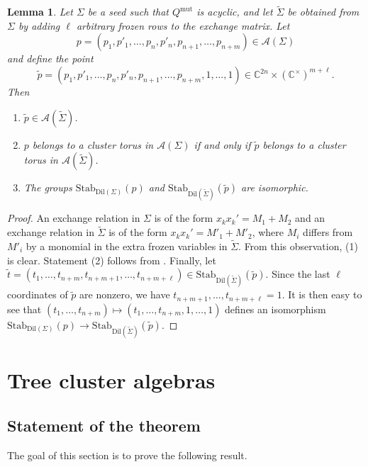 \documentclass{amsart}
\newcommand{\seed}{\Sigma}
\newcommand{\mut}{\mathrm{mut}}
\newcommand{\var}{\mathcal{A}}
\newcommand{\Stab}{\mathrm{Stab}}
\newcommand{\C}{\mathbb{C}}
\numberwithin{equation}{section}
\newtheorem{lemma}[theorem]{Lemma}
\theoremstyle{definition}
\newcommand{\dil}{\mathrm{Dil}}
\begin{document}
\begin{lemma}\label{lem:creating-deep-points-frozens}
    Let $\seed$ be a seed such that $Q^{\mut}$ is acyclic, and let $\widetilde{\seed}$ be obtained from $\seed$ by adding $\ell$ arbitrary frozen rows to the exchange matrix. Let 
    \[
    p = (p_1,p'_1,\dots, p_n, p'_n, p_{n+1}, \dots, p_{n+m}) \in \var(\seed)
    \]
    and define the point
    \[
    \widetilde{p} = (p_1, p'_1,\dots, p_n, p'_n, p_{n+1}, \dots, p_{n+m}, 1, \dots, 1) \in \C^{2n} \times (\C^{\times})^{m+\ell}.
    \]
    Then
    \begin{enumerate}
        \item $\widetilde{p} \in \var(\widetilde{\seed})$.
        \item $p$ belongs to a cluster torus in $\var(\seed)$ if and only if $\widetilde{p}$ belongs to a cluster torus in $\var(\widetilde{\seed})$.
        \item The groups $\Stab_{\dil(\seed)}(p)$ and $\Stab_{\dil(\widetilde{\seed})}(\widetilde{p})$ are isomorphic.
    \end{enumerate}
\end{lemma}
\begin{proof}
An exchange relation in $\seed$ is of the form $x_kx_k' = M_1 + M_2$ and an exchange relation in $\widetilde{\seed}$ is of the form $x_kx_k' = M'_1 + M'_2$, where $M_i$ differs from $M'_i$ by a monomial in the extra frozen variables in $\widetilde{\seed}$. From this observation, (1) is clear. Statement (2) follows from \cite[Lemma 3.3.2]{FWZ}. Finally, let $\widetilde{t} = (t_1, \dots, t_{n+m}, t_{n+m+1}, \dots, t_{n+m+\ell}) \in \Stab_{\dil(\widetilde{\seed})}(\widetilde{p})$. Since the last $\ell$ coordinates of $\widetilde{p}$ are nonzero, we have $t_{n+m+1}, \dots, t_{n+m+\ell} = 1$. It is then easy to see that $(t_1, \dots, t_{n+m}) \mapsto (t_1, \dots, t_{n+m}, 1, \dots, 1)$ defines an isomorphism $\Stab_{\dil(\seed)}(p) \to \Stab_{\dil(\widetilde{\seed})}(\widetilde{p})$. 
\end{proof}


\section{Tree cluster algebras}\label{sec:trees}

\subsection{Statement of the theorem} The goal of this section is to prove the following result. 
\end{document}
